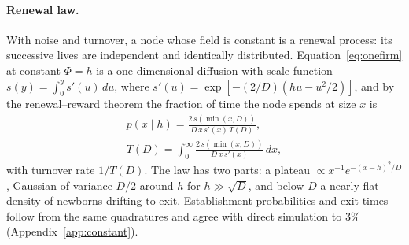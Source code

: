 \documentclass[pre,twocolumn,superscriptaddress,nofootinbib]{revtex4-2}
\begin{document}
\paragraph{Renewal law.}  With noise and turnover, a node whose field is constant is a renewal
process: its successive lives are independent and identically distributed.  Equation~\eqref{eq:onefirm}
at constant $\Phi=h$ is a one-dimensional diffusion with scale function $s(y)=\int_0^ys'(u)\,du$, where
$s'(u)=\exp[-(2/D)(hu-u^2/2)]$, and by the renewal--reward theorem the fraction of time the node spends
at size $x$ is
\begin{gather}
p(x\mid h)=\frac{2\,s(\min(x,D))}{D\,x\,s'(x)\,T(D)},\nonumber\\
T(D)=\int_0^\infty\frac{2\,s(\min(x,D))}{D\,x\,s'(x)}\,dx,
\label{eq:renewal}
\end{gather}
with turnover rate $1/T(D)$.  The law has two parts: a plateau $\propto x^{-1}e^{-(x-h)^2/D}$, Gaussian of
variance $D/2$ around $h$ for $h\gg\sqrt D$, and below $D$ a nearly flat density of newborns drifting to exit.  Establishment probabilities and
exit times follow from the same quadratures and agree with direct simulation to $3\%$ (Appendix~\ref{app:constant}).
\end{document}
